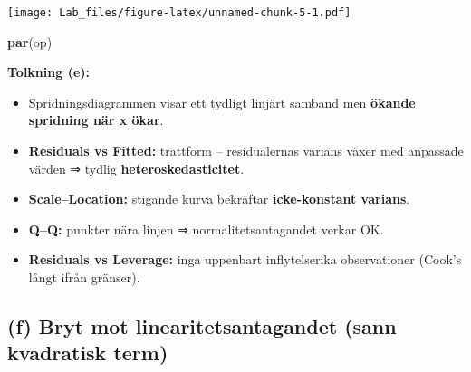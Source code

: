 \documentclass[
  11pt,
]{article}
\newenvironment{Shaded}{\begin{snugshade}}{\end{snugshade}}
\newcommand{\FunctionTok}[1]{\textcolor[rgb]{0.13,0.29,0.53}{\textbf{#1}}}
\newcommand{\NormalTok}[1]{#1}
\providecommand{\tightlist}{%
  \setlength{\itemsep}{0pt}\setlength{\parskip}{0pt}}
\begin{document}
\texttt{[image: Lab\_files/figure-latex/unnamed-chunk-5-1.pdf]}

\begin{Shaded}
\begin{Highlighting}[]
\FunctionTok{par}\NormalTok{(op)}
\end{Highlighting}
\end{Shaded}

\textbf{Tolkning (e):}

\begin{itemize}
\tightlist
\item
  Spridningsdiagrammen visar ett tydligt linjärt samband men
  \textbf{ökande spridning när x ökar}.
\item
  \textbf{Residuals vs Fitted:} trattform -- residualernas varians växer
  med anpassade värden ⇒ tydlig \textbf{heteroskedasticitet}.
\item
  \textbf{Scale--Location:} stigande kurva bekräftar
  \textbf{icke-konstant varians}.
\item
  \textbf{Q--Q:} punkter nära linjen ⇒ normalitetsantagandet verkar OK.
\item
  \textbf{Residuals vs Leverage:} inga uppenbart inflytelserika
  observationer (Cook's långt ifrån gränser).
\end{itemize}

\subsection{(f) Bryt mot linearitetsantagandet (sann kvadratisk
term)}\label{f-bryt-mot-linearitetsantagandet-sann-kvadratisk-term}
\end{document}
